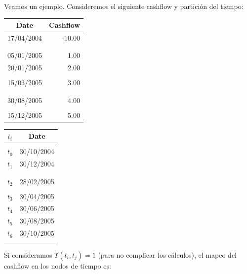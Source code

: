 Veamos un ejemplo. Consideremos el siguiente cashflow y partici\'on del tiempo:
\newline
\newline
\begin{minipage}[c]{0.5\columnwidth}%
\centering
\begin{tabular}{c|r}
\textbf{Date} & \textbf{Cashflow} \\
\hline
17/04/2004 & -10.00 \\
           &        \\
           &        \\
05/01/2005 &   1.00 \\
20/01/2005 &   2.00 \\
           &        \\
15/03/2005 &   3.00 \\
           &        \\
           &        \\
30/08/2005 &   4.00 \\
           &        \\
15/12/2005 &   5.00 \\
\end{tabular}
\end{minipage}%
\begin{minipage}[c]{0.5\columnwidth}%
\centering
\begin{tabular}{c|c}
\textbf{$t_i$} & \textbf{Date} \\
\hline
      &            \\
$t_0$ & 30/10/2004 \\
$t_1$ & 30/12/2004 \\
      &            \\
      &            \\
$t_2$ & 28/02/2005 \\
      &            \\
$t_3$ & 30/04/2005 \\
$t_4$ & 30/06/2005 \\
$t_5$ & 30/08/2005 \\
$t_6$ & 30/10/2005 \\
      &            \\
\end{tabular}
\end{minipage}%
\newline
\newline
Si consideramos $\Upsilon(t_i,t_j)=1$ (para no complicar los c\'alculos), el mapeo
del cashflow en los nodos de tiempo es:
